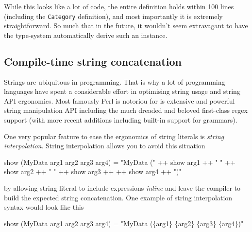 \documentclass[
]{article}
\newenvironment{Shaded}{}{}
\newcommand{\DataTypeTok}[1]{\textcolor[rgb]{0.56,0.13,0.00}{#1}}
\newcommand{\FunctionTok}[1]{\textcolor[rgb]{0.02,0.16,0.49}{#1}}
\newcommand{\NormalTok}[1]{#1}
\newcommand{\OperatorTok}[1]{\textcolor[rgb]{0.40,0.40,0.40}{#1}}
\newcommand{\OtherTok}[1]{\textcolor[rgb]{0.00,0.44,0.13}{#1}}
\newcommand{\StringTok}[1]{\textcolor[rgb]{0.25,0.44,0.63}{#1}}
\begin{document}
While this looks like a lot of code, the entire definition holds within
100 lines (including the \texttt{Category} definition), and most
importantly it is extremely straightforward. So much that in the future,
it wouldn't seem extravagant to have the type-system automatically
derive such an instance.

\hypertarget{compile-time-string-concatenation}{%
\subsection{Compile-time string
concatenation}\label{compile-time-string-concatenation}}

Strings are ubiquitous in programming. That is why a lot of programming
languages have spent a considerable effort in optimising string usage
and string API ergonomics. Most famously Perl is notoriou for is
extensive and powerful string manipulation API including the much
dreaded and beloved first-class regex support (with more recent
additions including built-in support for grammars).

One very popular feature to ease the ergonomics of string literals is
\emph{string interpolation}. String interpolation allows you to avoid
this situation

\begin{Shaded}
\begin{Highlighting}[]
\FunctionTok{show}\NormalTok{ (}\DataTypeTok{MyData}\NormalTok{ arg1 arg2 arg3 arg4) }\OtherTok{=} \StringTok{"MyData ("} \OperatorTok{++} \FunctionTok{show}\NormalTok{ arg1 }\OperatorTok{++} \StringTok{" "} \OperatorTok{++} \FunctionTok{show}\NormalTok{ arg2 }\OperatorTok{++} \StringTok{" "} \OperatorTok{++} \FunctionTok{show}\NormalTok{ arg3 }\OperatorTok{++} \OperatorTok{++} \FunctionTok{show}\NormalTok{ arg4 }\OperatorTok{++} \StringTok{")"}
\end{Highlighting}
\end{Shaded}

by allowing string literal to include expressions \emph{inline} and
leave the compiler to build the expected string concatenation. One
example of string interpolation syntax would look like this

\begin{Shaded}
\begin{Highlighting}[]
\FunctionTok{show}\NormalTok{ (}\DataTypeTok{MyData}\NormalTok{ arg1 arg2 arg3 arg4) }\OtherTok{=} \StringTok{"MyData (\{arg1\} \{arg2\} \{arg3\} \{arg4\})"}
\end{Highlighting}
\end{Shaded}
\end{document}
